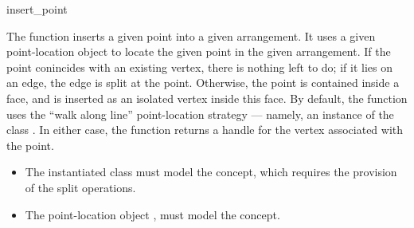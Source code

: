 \ccRefPageBegin

\begin{ccRefFunction}{insert_point}

\ccDefinition

The function \ccRefName{} inserts a given point into a given arrangement.
It uses a given point-location object to locate the given
point in the given arrangement. If the point conincides with an existing
vertex, there is nothing left to do; if it lies on an edge, the edge is
split at the point. Otherwise, the point is contained inside a face, and is
inserted as an isolated vertex inside this face.
By default, the function uses the ``walk along line'' point-location
strategy --- namely, an instance of the class
.
In either case, the function returns a handle for the vertex associated
with the point.



\ccRequirements
\begin{itemize}
\item The instantiated  class must model the
   concept, which requires the provision
  of the split operations.
\item The point-location object , must model the
   concept.
\end{itemize}

\end{ccRefFunction}

\ccRefPageEnd
